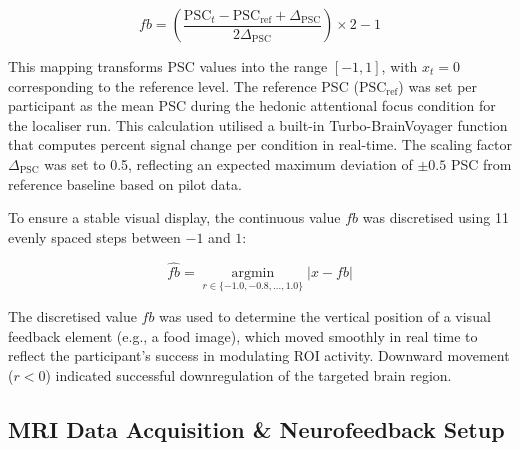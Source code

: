 \documentclass[]{imag-ms-template}
\begin{document}
\begin{equation}
fb = \left( \frac{\mathrm{PSC}_t - \mathrm{PSC}_{\mathrm{ref}} + \Delta_{\mathrm{PSC}}}{2 \Delta_{\mathrm{PSC}}} \right) \times 2 - 1
\end{equation}

This mapping transforms PSC values into the range $[-1, 1]$, with $x_t = 0$ corresponding to the reference level. The reference PSC ($\mathrm{PSC}_{\mathrm{ref}}$) was set per participant as the mean PSC during the hedonic attentional focus condition for the localiser run. This calculation utilised a built-in Turbo-BrainVoyager function that computes percent signal change per condition in real-time. The scaling factor $\Delta_{\mathrm{PSC}}$ was set to 0.5, reflecting an expected maximum deviation of $\pm 0.5$ PSC from reference baseline based on pilot data. %

To ensure a stable visual display, the continuous value $fb$ was discretised using 11 evenly spaced steps between $-1$ and $1$:

\begin{equation}
\hat{fb} = \underset{r \in \{-1.0, -0.8, \dots, 1.0\}}{\operatorname{argmin}} \left| x - fb \right|
\end{equation}

The discretised value $\hat{fb}$ was used to determine the vertical position of a visual feedback element (e.g., a food image), which moved smoothly in real time to reflect the participant’s success in modulating ROI activity. Downward movement ($r <0$) indicated successful downregulation of the targeted brain region.

\subsection{MRI Data Acquisition \& Neurofeedback Setup}
\end{document}
